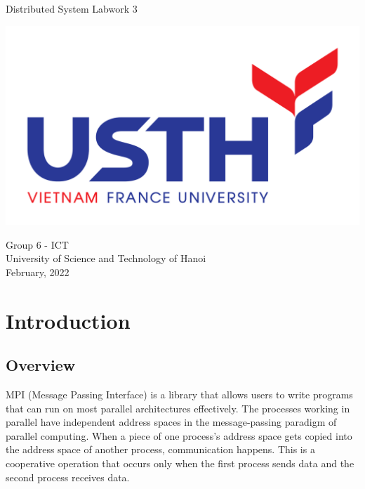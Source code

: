 \documentclass[13pt]{article}
\begin{document}
\begin{titlepage}
    \begin{center}
        \vspace*{1.8cm}
        \Large
        Distributed System Labwork 3\\
        \Large
        \vspace{0.5cm}
        \begin{center}
            \includegraphics[scale=1.0]{logo USTH-01.PNG}
        \end{center}  
        \vspace{0.5cm}
            Group 6 - ICT\\
        \vspace{0.5cm}
            University of Science and Technology of Hanoi\\
        \vspace{0.5cm}
            February, 2022
        \vfill
          
   \end{center}
\end{titlepage}

\newpage
\tableofcontents
\newpage

\section{Introduction}
\subsection{Overview}
\noindent%
MPI (Message Passing Interface) is a library that allows users to write programs that can run on most parallel architectures effectively. The processes working in parallel have independent address spaces in the message-passing paradigm of parallel computing. When a piece of one process's address space gets copied into the address space of another process, communication happens. This is a cooperative operation that occurs only when the first process sends data and the second process receives data.
\end{document}
